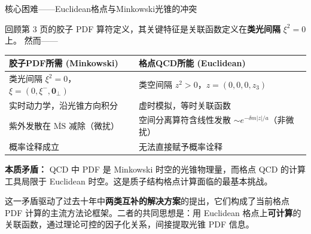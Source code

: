 \documentclass[10pt,aspectratio=169]{beamer}
\newcommand{\msbar}{\overline{\mathrm{MS}}}
\begin{document}
\begin{frame}{核心困难——Euclidean格点与Minkowski光锥的冲突}

  回顾第 3 页的胶子 PDF 算符定义，其关键特征是关联函数定义在\textbf{类光间隔} $\xi^2 = 0$ 上。
  然而——

  \begin{center}
  \begin{tabular}{p{}|p{}}
    \hline
    \textbf{胶子PDF所需 (Minkowski)} & \textbf{格点QCD所能 (Euclidean)} \\
    \hline
    类光间隔 $\xi^2 = 0$，$\xi = (0,\xi^-,\mathbf{0}_\perp)$ &
    类空间隔 $z^2 > 0$，$z = (0,0,0,z_3)$ \\
    实时动力学，沿光锥方向积分 &
    虚时模拟，等时关联函数 \\
    紫外发散在 $\msbar$ 减除（微扰） &
    空间分离算符含线性发散 $\sim e^{-\delta m|z|/a}$（非微扰） \\
    概率诠释成立 &
    无法直接赋予概率诠释 \\
    \hline
  \end{tabular}
  \end{center}

  \textbf{本质矛盾：} QCD 中 PDF 是 Minkowski 时空的光锥物理量，而格点 QCD 的计算工具局限于 Euclidean 时空。这是质子结构格点计算面临的最基本挑战。

  \vspace{4pt}
  这一矛盾驱动了过去十年中\textbf{两类互补的解决方案}的提出，它们构成了当前格点 PDF 计算的主流方法论框架。二者的共同思想是：用 Euclidean 格点上\textbf{可计算}的关联函数，通过理论可控的因子化关系，间接提取光锥 PDF 信息。
\end{frame}
\end{document}
